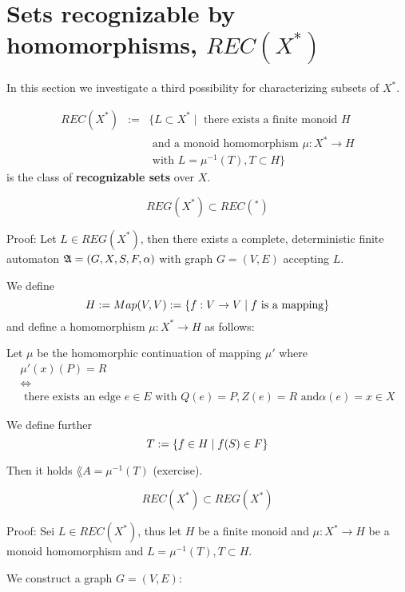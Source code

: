 \section{Sets recognizable by homomorphisms, $REC(X^*)$}

In this section we investigate a third possibility for characterizing subsets of
$X^*$.

\begin{definition}
\begin{eqnarray*}
 REC(X^*) & := & \{ L \subset X^* \mid \mbox{ there exists a
finite monoid } H \\
& & \mbox{ and a monoid homomorphism }\mu : X^* \to H \\
& & \mbox{ with } L = \mu^{-1}(T), T \subset H \}
\end{eqnarray*}
is the class of {\bf recognizable sets} over $X$.
\end{definition}

\begin{lemma}
\[ REG(X^*) \subset REC(^*) \]
\end{lemma}

Proof: Let $L \in REG(X^*)$, then there exists a complete, deterministic finite
automaton $\mbox{$\mathfrak{A}$} = (G, X, S, F, \alpha)$ with graph $G = (V, E)$ accepting $L$.

We define 
\[ H := Map(V,V) := \mbox{$\{f : V \to V \mid f \mbox{ is a mapping}\}$} \]
and define a homomorphism $\mu : X^* \to H$ as follows:

Let $\mu$ be the homomorphic continuation of mapping $\mu'$ where
\begin{eqnarray*}
& \mu'(x)(P) = R & \\
& \Leftrightarrow & \\
& \mbox{ there exists an edge }e \in E\mbox{ with }Q(e) = P, Z(e) = R\mbox{ and
}\alpha(e) = x \in X &
\end{eqnarray*}

We define further \[ T := \mbox{$\{f \in H \mid f(S) \in F\}$} \]

Then it holds $\lang{A} = \mu^{-1}(T)$ (exercise).

\begin{lemma}
\[ REC(X^*) \subset REG(X^*) \]
\end{lemma}

Proof: Sei $L \in REC(X^*)$, thus let $H$ be a finite monoid and $\mu : X^* \to
H$ be a monoid homomorphism and $L = \mu^{-1}(T), T \subset H$.

We construct a graph $G = (V, E)$:


